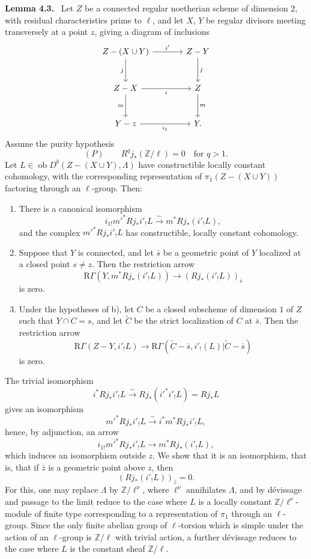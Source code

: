 \documentclass[11pt]{article}
\newenvironment{statement}[1]{\par\medskip\noindent\textbf{#1.}\ }{\par\medskip}
\providecommand{\Ob}{\operatorname{ob}}
\begin{document}
\begin{statement}{Lemma 4.3}
Let $Z$ be a connected regular noetherian scheme of dimension $2$, with residual characteristics prime to $\ell$, and let $X$, $Y$ be regular divisors meeting transversely at a point $z$, giving a diagram of inclusions
\[
\begin{tikzcd}[column sep=large,row sep=large]
Z-(X\cup Y) \arrow[r,"i'"] \arrow[d,"j"'] & Z-Y \arrow[d,"j"]\\
Z-X \arrow[r,"i"'] \arrow[d,"m"'] & Z \arrow[d,"m"]\\
Y-z \arrow[r,"i_1"'] & Y .
\end{tikzcd}
\]
Assume the purity hypothesis
\[
(P)\qquad R^qj_*(\mathbb Z/\ell)=0\quad\text{for }q>1.
\]
Let $L\in\Ob D^b(Z-(X\cup Y),\Lambda)$ have constructible locally constant cohomology, with the corresponding representation of $\pi_1(Z-(X\cup Y))$ factoring through an $\ell$-group. Then:
\begin{enumerate}[label=\alph*)]
\item There is a canonical isomorphism
\[
i_{1!}m'^*Rj_*i'_!L\xrightarrow{\sim} m^*Rj_*(i'_!L),
\]
and the complex $m'^*Rj_*i'_!L$ has constructible, locally constant cohomology.
\item Suppose that $Y$ is connected, and let $\bar s$ be a geometric point of $Y$ localized at a closed point $s\ne z$. Then the restriction arrow
\[
\mathrm R\Gamma(Y,m^*Rj_*(i'_!L))\longrightarrow (Rj_*(i'_!L))_{\bar s}
\tag{4.3.1}
\]
is zero.
\item Under the hypotheses of b), let $C$ be a closed subscheme of dimension $1$ of $Z$ such that $Y\cap C=s$, and let $\widetilde C$ be the strict localization of $C$ at $\bar s$. Then the restriction arrow
\[
\mathrm R\Gamma(Z-Y,i'_!L)
\longrightarrow
\mathrm R\Gamma(\widetilde C-\bar s,i'_!(L)|\widetilde C-\bar s)
\tag{4.3.2}
\]
is zero.
\end{enumerate}
\end{statement}

The trivial isomorphism
\[
i^*Rj_*i'_!L\xrightarrow{\sim}Rj_*(i'^*i'_!L)=Rj_*L
\]
gives an isomorphism
\[
m'^*Rj_*i'_!L\xrightarrow{\sim} i^*m^*Rj_*i'_!L,
\]
hence, by adjunction, an arrow
\[
i_{1!}m'^*Rj_*i'_!L\longrightarrow m^*Rj_*(i'_!L),
\]
which induces an isomorphism outside $z$. We show that it is an isomorphism, that is, that if $\bar z$ is a geometric point above $z$, then
\[
(Rj_*(i'_!L))_{\bar z}=0.
\]
For this, one may replace $\Lambda$ by $\mathbb Z/\ell^\nu$, where $\ell^\nu$ annihilates $\Lambda$, and by dévissage and passage to the limit reduce to the case where $L$ is a locally constant $\mathbb Z/\ell^\nu$-module of finite type corresponding to a representation of $\pi_1$ through an $\ell$-group. Since the only finite abelian group of $\ell$-torsion which is simple under the action of an $\ell$-group is $\mathbb Z/\ell$ with trivial action, a further dévissage reduces to the case where $L$ is the constant sheaf $\mathbb Z/\ell$.
\end{document}

